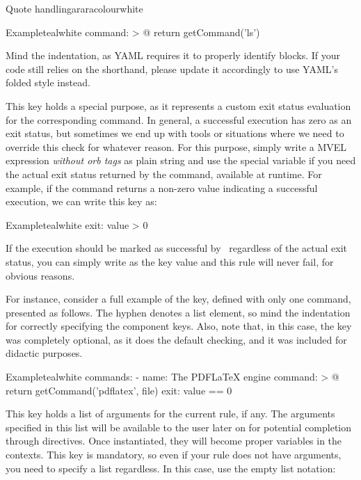 \begin{description}
\begin{description}
\begin{messagebox}{Quote handling}{araracolour}{\icinfo}{white}
\begin{codebox}{Example}{teal}{\icnote}{white}
command: >
  @{
    return getCommand('ls')
  }
\end{codebox}

Mind the indentation, as YAML requires it to properly identify blocks. If your code still relies on the  shorthand, please update it accordingly to use YAML's folded style instead.
\end{messagebox}

\item[\describecontext{O}{commands}{exit}] This key holds a special purpose, as it represents a custom exit status evaluation for the corresponding command. In general, a successful execution has zero as an exit status, but sometimes we end up with tools or situations where we need to override this check for whatever reason. For this purpose, simply write a MVEL expression \emph{without orb tags} as plain string and use the special variable  if you need the actual exit status returned by the command, available at runtime. For example, if the command returns a non-zero value indicating a successful execution, we can write this key as:

\begin{codebox}{Example}{teal}{\icnote}{white}
exit: value > 0
\end{codebox}

If the execution should be marked as successful by \arara\ regardless of the actual exit status, you can simply write  as the key value and this rule will never fail, for obvious reasons.
\end{description}

For instance, consider a full example of the  key, defined with only one command, presented as follows. The hyphen denotes a list element, so mind the indentation for correctly specifying the component keys. Also, note that, in this case, the  key was completely optional, as it does the default checking, and it was included for didactic purposes.

\begin{codebox}{Example}{teal}{\icnote}{white}
commands:
- name: The PDFLaTeX engine
  command: >
    @{
      return getCommand('pdflatex', file)
    }
  exit: value == 0
\end{codebox}

\item[\describe{M}{arguments}] This key holds a list of arguments for the current rule, if any. The arguments specified in this list will be available to the user later on for potential completion through directives. Once instantiated, they will become proper variables in the  contexts. This key is mandatory, so even if your rule does not have arguments, you need to specify a list regardless. In this case, use the empty list notation:


\end{description}
